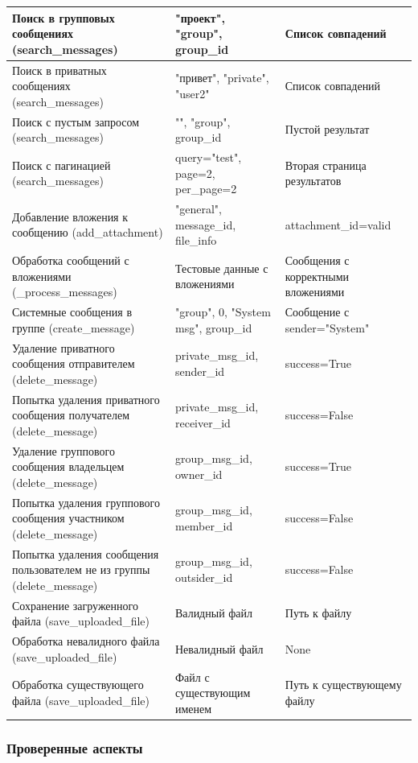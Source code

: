 \begin{xltabular}{\linewidth}{|X|X|X|}
	Поиск в групповых сообщениях (search\_messages) & "проект", "group", group\_id & Список совпадений \\ \hline
	Поиск в приватных сообщениях (search\_messages) & "привет", "private", "user2" & Список совпадений \\ \hline
	Поиск с пустым запросом (search\_messages) & "", "group", group\_id & Пустой результат \\ \hline
	Поиск с пагинацией (search\_messages) & query="test", page=2, per\_page=2 & Вторая страница результатов \\ \hline
	Добавление вложения к сообщению (add\_attachment) & "general", message\_id, file\_info & attachment\_id=valid \\ \hline
	Обработка сообщений с вложениями (\_process\_messages) & Тестовые данные с вложениями & Сообщения с корректными вложениями \\ \hline
	Системные сообщения в группе (create\_message) & "group", 0, "System msg", group\_id & Сообщение с sender="System" \\ \hline
	Удаление приватного сообщения отправителем (delete\_message) & private\_msg\_id, sender\_id & success=True \\ \hline
	Попытка удаления приватного сообщения получателем (delete\_message) & private\_msg\_id, receiver\_id & success=False \\ \hline
	Удаление группового сообщения владельцем (delete\_message) & group\_msg\_id, owner\_id & success=True \\ \hline
	Попытка удаления группового сообщения участником (delete\_message) & group\_msg\_id, member\_id & success=False \\ \hline
	Попытка удаления сообщения пользователем не из группы (delete\_message) & group\_msg\_id, outsider\_id & success=False \\ \hline
	Сохранение загруженного файла (save\_uploaded\_file) & Валидный файл & Путь к файлу \\ \hline
	Обработка невалидного файла (save\_uploaded\_file) & Невалидный файл & None \\ \hline
	Обработка существующего файла (save\_uploaded\_file) & Файл с существующим именем & Путь к существующему файлу \\ \hline
\end{xltabular}

\subsubsection{Проверенные аспекты}

